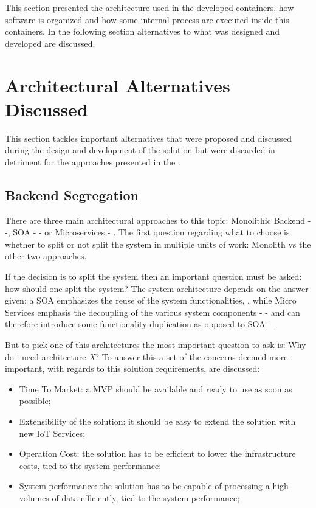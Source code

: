 This section presented the architecture used in the developed containers, how software is organized and how some internal process are executed inside this containers. In the following section alternatives to what was designed and developed are discussed.  

\section{Architectural Alternatives Discussed}
\label{sec:design:alternatives}

This section tackles important alternatives that were proposed and discussed during the design and development of the solution but were discarded in detriment for the approaches presented in the . 

\subsection{Backend Segregation}
\label{subsec:design:alternatives:backend}

There are three main architectural approaches to this topic: Monolithic Backend - \cite{micromono} -, \gls{SOA} - \cite{ibmsoa} - or Microservices - \cite{martinmicro}. The first question regarding what to choose is whether to split or not split the system in multiple units of work: Monolith vs the other two approaches.

If the decision is to split the system then an important question must be asked: how should one split the system? The system architecture depends on the answer given: a \gls{SOA} emphasizes the reuse of the system functionalities, \cite{ibmsoa}, while Micro Services emphasis the decoupling of the various system components - \cite{micromicro} - and can therefore introduce some functionality duplication as opposed to \gls{SOA} - \cite{soavsmicro}.

But to pick one of this architectures the most important question to ask is: Why do i need architecture \textit{X}? To answer this a set of the concerns deemed more important, with regards to this solution requirements, are discussed:

\begin{itemize}
   \item Time To Market: a \gls{MVP} should be available and ready to use as soon as possible;
   \item Extensibility of the solution: it should be easy to extend the solution with new \gls{IoT} Services;
   \item Operation Cost: the solution has to be efficient to lower the infrastructure costs, tied to the system performance;
   \item System performance: the solution has to be capable of processing a high volumes of data efficiently, tied to the system performance;
\end{itemize}


